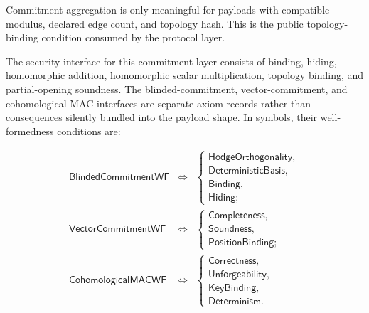 \begin{proposition}\label{prop:topology-compatible-aggregation}
  Commitment aggregation is only meaningful for payloads with compatible
  modulus, declared edge count, and topology hash. This is the public
  topology-binding condition consumed by the protocol layer.
\end{proposition}

The security interface for this commitment layer consists of binding, hiding,
homomorphic addition, homomorphic scalar multiplication, topology binding, and
partial-opening soundness. The blinded-commitment, vector-commitment, and
cohomological-MAC interfaces are separate axiom records rather than consequences
silently bundled into the payload shape. In symbols, their well-formedness
conditions are:

\[
\begin{array}{rcl}
  \mathsf{BlindedCommitmentWF}
  &\Longleftrightarrow&
  \left\{
  \begin{array}{l}
    \mathsf{HodgeOrthogonality},\\
    \mathsf{DeterministicBasis},\\
    \mathsf{Binding},\\
    \mathsf{Hiding};
  \end{array}
  \right.
  \\[1.5em]
  \mathsf{VectorCommitmentWF}
  &\Longleftrightarrow&
  \left\{
  \begin{array}{l}
    \mathsf{Completeness},\\
    \mathsf{Soundness},\\
    \mathsf{PositionBinding};
  \end{array}
  \right.
  \\[1.5em]
  \mathsf{CohomologicalMACWF}
  &\Longleftrightarrow&
  \left\{
  \begin{array}{l}
    \mathsf{Correctness},\\
    \mathsf{Unforgeability},\\
    \mathsf{KeyBinding},\\
    \mathsf{Determinism}.
  \end{array}
  \right.
\end{array}
\]

